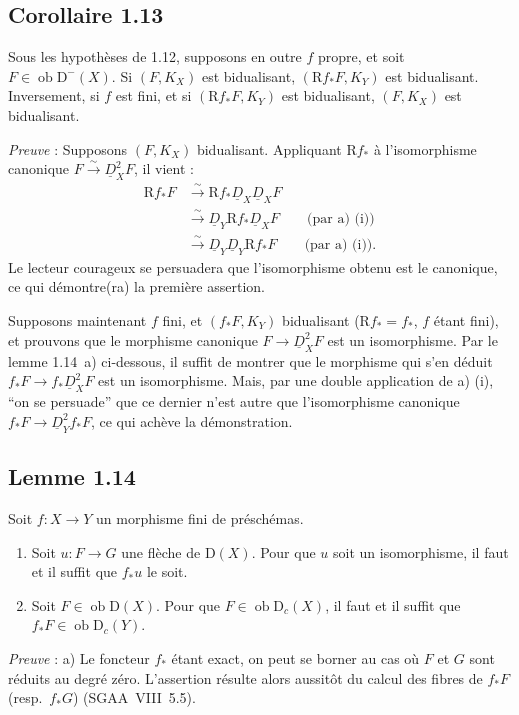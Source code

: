 \documentclass[11pt]{article}
\newcommand{\R}{\mathrm{R}}\newcommand{\RHomCore}{\mathrm{RHom}}
\newcommand{\D}{\mathrm{D}}
\newcommand{\ob}{\operatorname{ob}}
\providecommand{\ob}{\operatorname{ob}}
\providecommand{\R}{\mathrm R}
\begin{document}
\subsection*{Corollaire 1.13}
Sous les hypothèses de 1.12, supposons en outre $f$ propre, et soit $F \in \ob \D^{-}(X)$. Si $(F, K_X)$ est bidualisant, $(\R f_{*}F, K_Y)$ est bidualisant. Inversement, si $f$ est fini, et si $(\R f_{*}F, K_Y)$ est bidualisant, $(F, K_X)$ est bidualisant.

\emph{Preuve} : Supposons $(F, K_X)$ bidualisant. Appliquant $\R f_{*}$ à l'isomorphisme canonique $F \xrightarrow{\sim} \underline{D}_X^{2} F$, il vient :
\begin{align*}
\R f_{*} F &\xrightarrow{\sim} \R f_{*} \underline{D}_X \underline{D}_X F \\
&\xrightarrow{\sim} \underline{D}_Y \R f_{*} \underline{D}_X F \qquad \text{(par a) (i))} \\
&\xrightarrow{\sim} \underline{D}_Y \underline{D}_Y \R f_{*} F \qquad \text{(par a) (i)).}
\end{align*}
Le lecteur courageux se persuadera que l'isomorphisme obtenu est le canonique, ce qui démontre(ra) la première assertion.

Supposons maintenant $f$ fini, et $(f_{*}F, K_Y)$ bidualisant ($\R f_{*} = f_{*}$, $f$ étant fini), et prouvons que le morphisme canonique $F \to \underline{D}_X^{2} F$ est un isomorphisme. Par le lemme 1.14~a) ci-dessous, il suffit de montrer que le morphisme qui s'en déduit $f_{*}F \to f_{*}\underline{D}_X^{2} F$ est un isomorphisme. Mais, par une double application de a) (i), ``on se persuade'' que ce dernier n'est autre que l'isomorphisme canonique $f_{*}F \to \underline{D}_Y^{2} f_{*}F$, ce qui achève la démonstration.

\subsection*{Lemme 1.14}
Soit $f : X \to Y$ un morphisme fini de préschémas.
\begin{enumerate}
\item[a)] Soit $u : F \to G$ une flèche de $\D(X)$. Pour que $u$ soit un isomorphisme, il faut et il suffit que $f_{*}u$ le soit.
\item[b)]
Soit $F \in \ob \D(X)$. Pour que $F \in \ob \D_c(X)$, il faut et il suffit que $f_{*}F \in \ob \D_c(Y)$.
\end{enumerate}

\emph{Preuve} : a) Le foncteur $f_{*}$ étant exact, on peut se borner au cas où $F$ et $G$ sont réduits au degré zéro. L'assertion résulte alors aussitôt du calcul des fibres de $f_{*}F$ (resp.~$f_{*}G$) (SGAA~VIII~5.5).
\end{document}
